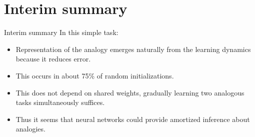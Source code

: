 \documentclass{beamer}
\begin{document}
\section{Interim summary}
\begin{frame}{Interim summary}
 In this simple task:
\begin{itemize}
    \item<2-> Representation of the analogy emerges naturally from the learning dynamics because it reduces error.
    \item<3-> This occurs in about 75\% of random initializations.
    \item<4-> This does not depend on shared weights, gradually learning two analogous tasks simultaneously suffices.
    \item<5-> Thus it seems that neural networks could provide amortized inference about analogies. 
\end{itemize}
\end{frame}
\end{document}
